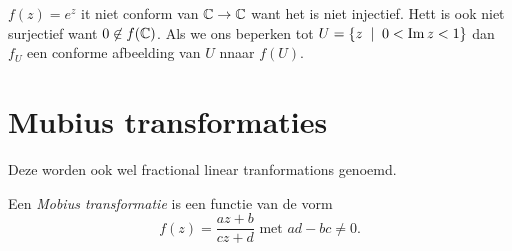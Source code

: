 \begin{vb}
	$f(z) = e^{z}$ it niet conform van $\mathbb{C} \to \mathbb{C}$ want het is niet injectief. Hett is ook niet surjectief want $0 \not\in f(\mathbb{C})$.
	Als we ons beperken tot $U = \{z \st 0 < \im z < 1\} $ dan $f_U$ een conforme afbeelding van $U$ nnaar $f(U)$. 
\end{vb}
\section{Mubius transformaties} \label{sec:mubius_transformaties}
Deze worden ook wel fractional linear tranformations genoemd.
\begin{definitie}
	Een \emph{Mobius transformatie} is een functie van de vorm 
	\[
		f(z) = \frac{az + b}{cz + d} \text{ met } ad - bc \ne 0
	.\] 
\end{definitie}
